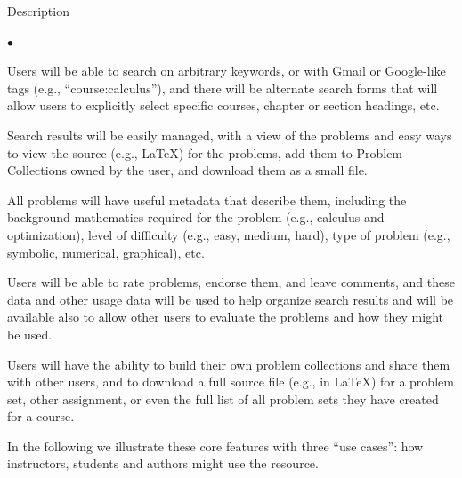 \documentclass[11pt]{article}
\begin{document}
\begin{section}{Description}
\begin{list}{$\bullet$}{\setlength{\parsep}{0pt}\setlength{\itemsep}{0pt}}
  \item
    Users will be able to search on arbitrary keywords, or with Gmail or
    Google-like tags (e.g., ``course:calculus''), and there will be
    alternate search forms that will allow users to explicitly select
    specific courses, chapter or section headings, etc.
  \item
    Search results will be easily managed, with a view of the problems and
    easy ways to view the source (e.g., \LaTeX) for the problems, add them
    to Problem Collections owned by the user, and download them as a small
    file.
  \item
    All problems will have useful metadata that describe them, including
    the background mathematics required for the problem (e.g., calculus
    and optimization), level of difficulty (e.g., easy, medium, hard),
    type of problem (e.g., symbolic, numerical, graphical), etc.
  \item
    Users will be able to rate problems, endorse them, and leave comments,
    and these data and other usage data will be used to help organize
    search results and will be available also to allow other users to
    evaluate the problems and how they might be used. 
  \item
    Users will have the ability to build their own problem collections and
    share them with other users, and to download a full source file (e.g.,
    in \LaTeX) for a problem set, other assignment, or even the full list
    of all problem sets they have created for a course. 
\end{list}

In the following we illustrate these core features with three ``use
cases'': how instructors, students and authors might use the resource.




\end{section}
\end{document}
